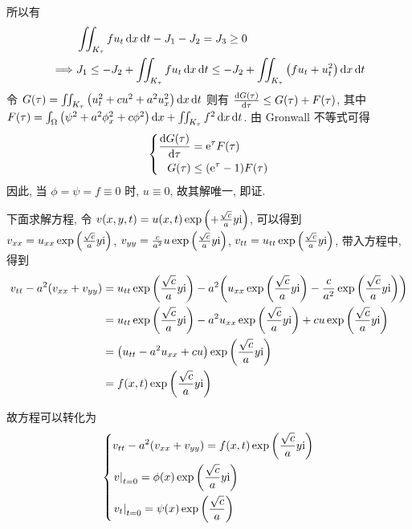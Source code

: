 所以有
\[ \begin{aligned}
& \iint_{K_\tau} f u_t \operatorname{d\!} x \operatorname{d\!} t - J_1 - J_2 = J_3 \geq 0 \\
\implies & J_1 \leq -J_2 + \iint_{K_\tau} f u_t \operatorname{d\!} x \operatorname{d\!} t
  \leq -J_2 + \iint_{K_\tau} {\left( {f u_t + u_t^2} \right)} \operatorname{d\!} x \operatorname{d\!} t
\end{aligned} \]
令 $G(\tau) = \iint_{K_\tau}{\left( {u_t^2 + c u^2 + a^2 u_x^2} \right)}\operatorname{d\!} x\operatorname{d\!} t$
则有 ${\frac{\operatorname{d\!} {G(\tau)}}{\operatorname{d\!} {\tau}}} \leq G(\tau) + F(\tau)$, 其中
$F(\tau) = \int_\Omega {\left( {\psi^2 + a^2 \phi_x^2 + c\phi^2} \right)} \operatorname{d\!} x
+\iint_{K_\tau} f^2 \operatorname{d\!} x \operatorname{d\!} t$.
由 Gronwall 不等式可得
\[ {\left\{ \begin{aligned} 
	{\frac{\operatorname{d\!}{G(\tau)}}{\operatorname{d\!}{\tau}}} &= {\mathrm e}^\tau F(\tau) \\
	G(\tau) &\leq ({\mathrm e}^\tau - 1) F(\tau)
 \end{aligned} \right.} \]
因此, 当 $\phi = \psi = f \equiv 0$ 时, $u \equiv 0$, 故其解唯一, 即证.

下面求解方程, 令 $v(x, y, t) = u(x, t) \exp{\left( {+\frac{\sqrt{c}}{a}y{\mathrm i}} \right)}$,
可以得到 $v_{xx} = u_{xx} \exp{\left( {\frac{\sqrt{c}}{a}y{\mathrm i}} \right)}$,
$v_{yy} = \frac{c}{a^2} u \exp{\left( {\frac{\sqrt{c}}{a}y{\mathrm i}} \right)}$,
$v_{tt} = u_{tt} \exp{\left( {\frac{\sqrt{c}}{a}y{\mathrm i}} \right)}$, 带入方程中, 得到
\[ \begin{aligned}
v_{tt} - a^2 (v_{xx} + v_{yy}) &= u_{tt} \exp{\left( {\frac{\sqrt{c}}{a}y{\mathrm i}} \right)}
  - a^2 {\left( {
    u_{xx} \exp{\left( {\frac{\sqrt{c}}{a}y{\mathrm i}} \right)}
    - \frac{c}{a^2} \exp{\left( {\frac{\sqrt{c}}{a}y{\mathrm i}} \right)}
  } \right)} \\
&= u_{tt} \exp{\left( {\frac{\sqrt{c}}{a}y{\mathrm i}} \right)}
  - a^2 u_{xx} \exp{\left( {\frac{\sqrt{c}}{a}y{\mathrm i}} \right)}
  + c u \exp{\left( {\frac{\sqrt{c}}{a}y{\mathrm i}} \right)} \\
&= {\left( {u_{tt} - a^2 u_{xx} + cu} \right)} \exp{\left( {\frac{\sqrt{c}}{a}y{\mathrm i}} \right)} \\
&= f(x, t) \exp{\left( {\frac{\sqrt{c}}{a}y{\mathrm i}} \right)}
\end{aligned} \]

故方程可以转化为
\[ {\left\{ \begin{aligned} 
&v_{tt} - a^2 (v_{xx}+v_{yy}) = f(x, t) \exp{\left( {\frac{\sqrt{c}}{a}y{\mathrm i}} \right)}\\
&{\left.{v} \right|}_{t=0} = \phi(x) \exp{\left( {\frac{\sqrt{c}}{a}y{\mathrm i}} \right)} \\
&{\left.{v_t} \right|}_{t=0} = \psi(x) \exp{\left( {\frac{\sqrt{c}}{a}} \right)}
 \end{aligned} \right.} \]

